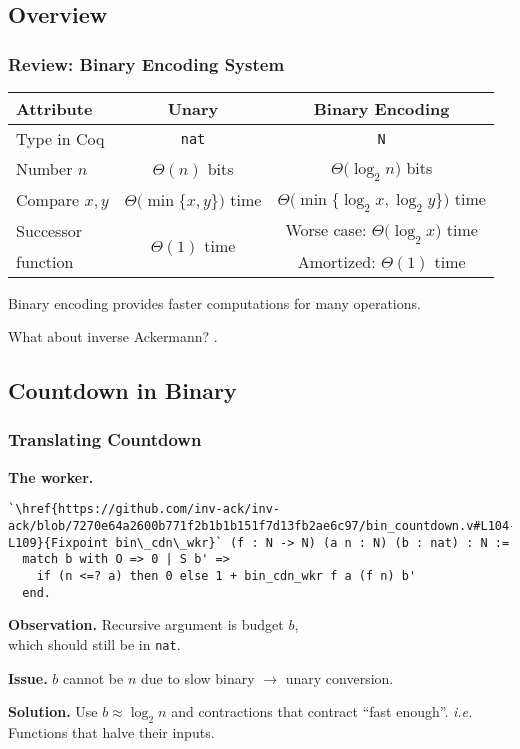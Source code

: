 
\subsection{Overview}

\begin{frame}
\frametitle{Review: Binary Encoding System}

\begin{tabular}{l|c|c}
	Attribute & Unary & Binary Encoding \\ \hline
	Type in Coq & \texttt{nat} & \texttt{N} \topspace{1pt} \\[6pt]
	Number $n$ & $\Theta(n)$ bits & $\Theta\big(\log_2n\big)$ bits \\[7pt]
	Compare $x, y$ & $\Theta\big(\min\{x, y\}\big)$ time & $\Theta\big(\min\{ \log_2x, \log_2y\}\big)$ time \\[9pt]
	Successor & \multirow{2}{*}{$\Theta(1)$ time} & Worse case: $\Theta\big(\log_2x\big)$ time \\[1pt]
	function  &             & Amortized: $\Theta(1)$ time \\
	                    
\end{tabular}

\bigskip

Binary encoding provides faster computations for many operations.

\smallskip

\pause 
What about inverse Ackermann? .

\end{frame}


\subsection{Countdown in Binary}


\begin{frame}[fragile]
\frametitle{Translating Countdown}

\textbf{The worker.}
\begin{lstlisting}
`\href{https://github.com/inv-ack/inv-ack/blob/7270e64a2600b771f2b1b1b151f7d13fb2ae6c97/bin_countdown.v#L104-L109}{Fixpoint bin\_cdn\_wkr}` (f : N -> N) (a n : N) (b : nat) : N :=
  match b with O => 0 | S b' =>
    if (n <=? a) then 0 else 1 + bin_cdn_wkr f a (f n) b'
  end.
\end{lstlisting}

\smallskip

\pause 
\textbf{Observation.} Recursive argument is budget $b$, \\which should still be in \texttt{nat}.

\bigskip

\textbf{Issue.} $b$ cannot be $n$ due to slow binary $\rightarrow$ unary conversion.

\bigskip

\pause 
\textbf{Solution.} Use $b \approx \log_2n$ and contractions that contract ``fast enough''. 
\emph{i.e.} Functions that halve their inputs.
\end{frame}


